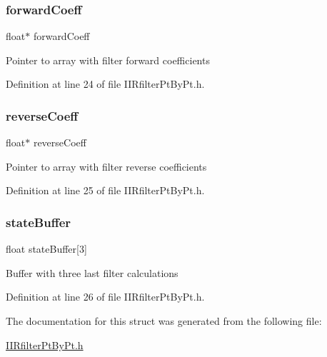 \subsubsection{\texorpdfstring{forwardCoeff}{forwardCoeff}}
{\footnotesize\ttfamily float$\ast$ forward\+Coeff}

Pointer to array with filter forward coefficients 

Definition at line 24 of file I\+I\+Rfilter\+Pt\+By\+Pt.\+h.

\mbox{\label{struct_i_i_r2nd_order_filter_obj_a71cf702e70d0407aedf468a1d5f09242_a71cf702e70d0407aedf468a1d5f09242}} 
\subsubsection{\texorpdfstring{reverseCoeff}{reverseCoeff}}
{\footnotesize\ttfamily float$\ast$ reverse\+Coeff}

Pointer to array with filter reverse coefficients 

Definition at line 25 of file I\+I\+Rfilter\+Pt\+By\+Pt.\+h.

\mbox{\label{struct_i_i_r2nd_order_filter_obj_a7a186ae4761a03abfb1fbb81c4916961_a7a186ae4761a03abfb1fbb81c4916961}} 
\subsubsection{\texorpdfstring{stateBuffer}{stateBuffer}}
{\footnotesize\ttfamily float state\+Buffer\mbox{[}3\mbox{]}}

Buffer with three last filter calculations 

Definition at line 26 of file I\+I\+Rfilter\+Pt\+By\+Pt.\+h.



The documentation for this struct was generated from the following file\+:\begin{DoxyCompactItemize}
\item 
\mbox{\hyperlink{_i_i_rfilter_pt_by_pt_8h}{I\+I\+Rfilter\+Pt\+By\+Pt.\+h}}\end{DoxyCompactItemize}
